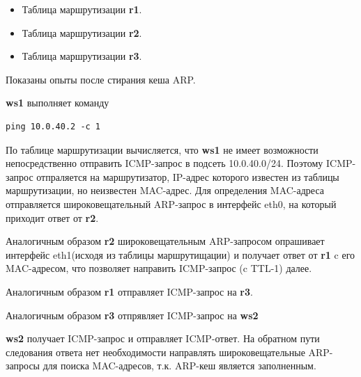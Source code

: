 \documentclass[a4paper,12pt]{article}
\begin{document}

\begin{itemize}
\item Таблица маршрутизации \textbf{r1}.

\item Таблица маршрутизации \textbf{r2}.

\item Таблица маршрутизации \textbf{r3}.
\end{itemize}

Показаны опыты после стирания кеша ARP.


\textbf{ws1} выполняет команду
\begin{verbatim}
ping 10.0.40.2 -c 1
\end{verbatim}

По таблице маршрутизации вычисляется, что \textbf{ws1} не имеет возможности непосредственно отправить ICMP-запрос в подсеть 10.0.40.0/24. Поэтому ICMP-запрос отпраляется на маршрутизатор, IP-адрес которого известен из таблицы маршрутизации, но неизвестен MAC-адрес. Для определения MAC-адреса отправляется широковещательный ARP-запрос в интерфейс eth0, на который приходит ответ от \textbf{r2}.

Аналогичным образом \textbf{r2} широковещательным ARP-запросом опрашивает интерфейс eth1(исходя из таблицы маршрутищации) и получает ответ от \textbf{r1} c его MAC-адресом, что позволяет направить ICMP-запрос (c TTL-1) далее.

Аналогичным образом \textbf{r1} отправляет ICMP-запрос на \textbf{r3}.

Аналогичным образом \textbf{r3} отпрявляет ICMP-запрос на \textbf{ws2}

\textbf{ws2} получает ICMP-запрос и отправляет ICMP-ответ. На обратном пути следования ответа нет необходимости направлять широковещательные ARP-запросы для поиска MAC-адресов, т.к. ARP-кеш является заполненным.
\end{document}
